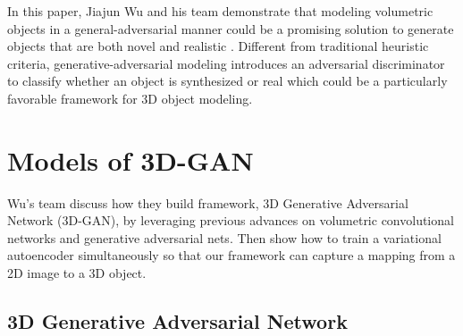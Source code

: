 \documentclass[10pt,twocolumn,letterpaper]{article}
\begin{document}
In this paper, Jiajun Wu and his team demonstrate that modeling volumetric objects in a general-adversarial manner could be a promising solution to generate objects that are both novel and realistic \cite{Wu2016Learning}. Different from traditional heuristic criteria, generative-adversarial modeling introduces an adversarial discriminator to classify whether an object is synthesized or real which could be a particularly favorable framework for 3D object modeling. 

\section{Models of 3D-GAN}

Wu's team discuss how they build framework, 3D Generative Adversarial Network (3D-GAN), by leveraging previous advances on volumetric convolutional networks and generative adversarial nets. Then show how to train a variational autoencoder simultaneously so that our framework can capture a mapping from a 2D image to a 3D object.

\begin{table*}
	\caption{Number of dataset images for each tag.}\label{t1}
	\begin{center}
		\end{center}
	\end{table*}


\subsection{3D Generative Adversarial Network}
\end{document}
